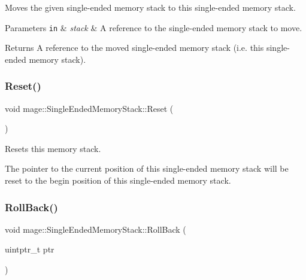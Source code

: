 Moves the given single-\/ended memory stack to this single-\/ended memory stack.


\begin{DoxyParams}[1]{Parameters}
\mbox{\tt in}  & {\em stack} & A reference to the single-\/ended memory stack to move. \\
\hline
\end{DoxyParams}
\begin{DoxyReturn}{Returns}
A reference to the moved single-\/ended memory stack (i.\+e. this single-\/ended memory stack). 
\end{DoxyReturn}
\hypertarget{classmage_1_1_single_ended_memory_stack_abd43ab7bd76655265123b934ea2bc7a7}{}\label{classmage_1_1_single_ended_memory_stack_abd43ab7bd76655265123b934ea2bc7a7} 
\subsubsection{\texorpdfstring{Reset()}{Reset()}}
{\footnotesize\ttfamily void mage\+::\+Single\+Ended\+Memory\+Stack\+::\+Reset (\begin{DoxyParamCaption}{ }\end{DoxyParamCaption})\hspace{0.3cm}{\ttfamily [noexcept]}}

Resets this memory stack.

The pointer to the current position of this single-\/ended memory stack will be reset to the begin position of this single-\/ended memory stack. \hypertarget{classmage_1_1_single_ended_memory_stack_afa1fcaa95a61995234759f9c57723202}{}\label{classmage_1_1_single_ended_memory_stack_afa1fcaa95a61995234759f9c57723202} 
\subsubsection{\texorpdfstring{Roll\+Back()}{RollBack()}}
{\footnotesize\ttfamily void mage\+::\+Single\+Ended\+Memory\+Stack\+::\+Roll\+Back (\begin{DoxyParamCaption}\item[{uintptr\+\_\+t}]{ptr }\end{DoxyParamCaption})\hspace{0.3cm}{\ttfamily [noexcept]}}

